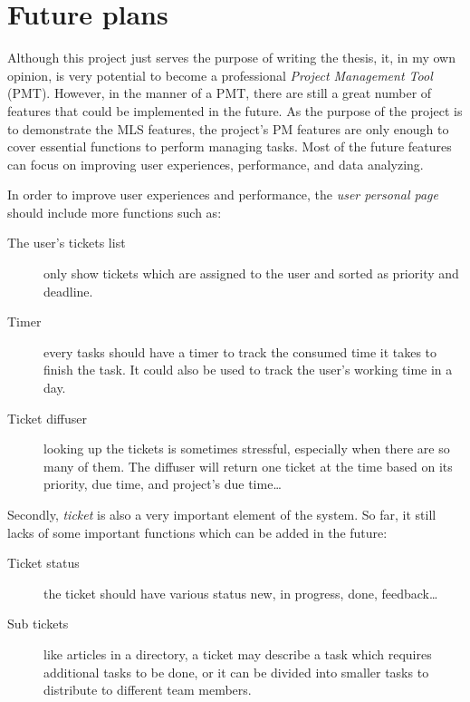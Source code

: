 
\chapter{Future plans} %

\label{ch:future_plan} %

Although this project just serves the purpose of writing the thesis, it, in my own opinion, is very potential to become a professional \emph{Project Management Tool} (PMT).
However, in the manner of a PMT, there are still a great number of features that could be implemented in the future.
As the purpose of the project is to demonstrate the MLS features, the project's PM features are only enough to cover essential functions to perform managing tasks.
Most of the future features can focus on improving user experiences, performance, and data analyzing.

In order to improve user experiences and performance, the \emph{user personal page} should include more functions such as:
\begin{description}
\item[The user's tickets list] only show tickets which are assigned to the user and sorted as priority and deadline.
\item[Timer] every tasks should have a timer to track the consumed time it takes to finish the task.
It could also be used to track the user's working time in a day.
\item[Ticket diffuser] looking up the tickets is sometimes stressful, especially when there are so many of them.
The diffuser will return one ticket at the time based on its priority, due time, and project's due time\dots
\end{description}

Secondly, \emph{ticket} is also a very important element of the system.
So far, it still lacks of some important functions which can be added in the future:
\begin{description}
\item[Ticket status] the ticket should have various status \eg new, in progress, done, feedback\dots
\item[Sub tickets] like articles in a directory, a ticket may describe a task which requires additional tasks to be done, or it can be divided into smaller tasks to distribute to different team members.
\end{description}

